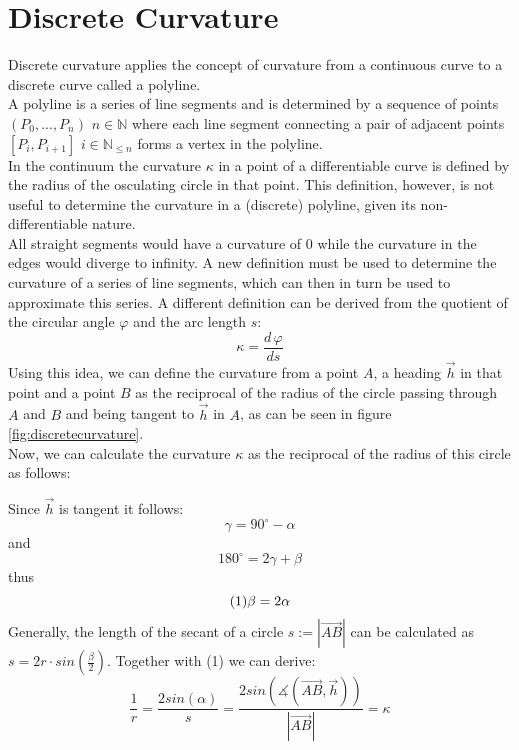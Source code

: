 \section{Discrete Curvature}

Discrete curvature applies the concept of curvature from a continuous curve to a discrete curve called a polyline.\\
A polyline is a series of line segments and is determined by a sequence of points $(P_0,...,P_n)$ $n \in \mathbb{N}$ where each line segment connecting a pair of adjacent points $[P_i,P_{i+1}]$ $i \in \mathbb{N}_{\le n}$ forms a vertex in the polyline.\\
In the continuum the curvature $\kappa$ in a point of a differentiable curve is defined by the radius of the osculating circle in that point. This definition, however, is not useful to determine the curvature in a (discrete) polyline, given its non-differentiable nature.\\ All straight segments would have a curvature of $0$ while the curvature in the edges would diverge to infinity. A new definition must be used to determine the curvature of a series of line segments, which can then in turn be used to approximate this series. A different definition can be derived from the quotient of the circular angle $\varphi$ and the arc length $s$:
$$\kappa  =  {\frac{{d\,\varphi}}{{ds}}}$$
Using this idea, we can define the curvature from a point $A$, a heading  $\vec h$ in that point and a point $B$ as the reciprocal of the radius of the circle passing through $A$ and $B$ and being tangent to  $\vec h$ in $A$, as can be seen in figure \ref{fig:discretecurvature}.
 \\ Now, we can calculate the curvature $\kappa$ as the reciprocal of the radius of this circle as follows:

Since $\vec h$ is tangent it follows: $$\gamma=90^{\circ} - \alpha$$ and $$180^{\circ}=2\gamma+\beta$$ thus $$(1) \space \beta = 2 \alpha$$
Generally, the length of the secant of a circle $s:=|\vec{AB}|$ can be calculated as
$s = 2r \cdot  sin(\frac{\beta}{2})$. Together with (1) we can derive:
$$\frac{1}{r} = \frac{2sin(\alpha)}{s} = \frac{2sin(\measuredangle(\vec{AB},\vec h))}{|\vec{AB}|} = \kappa$$\\

